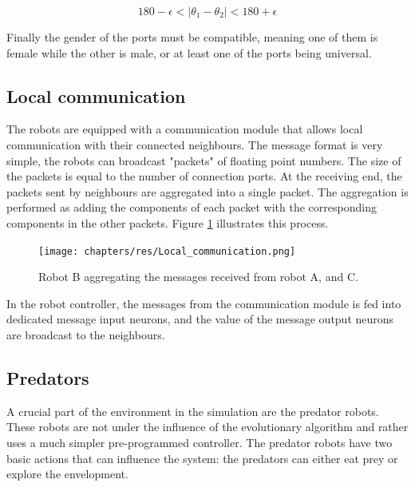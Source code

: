 \begin{equation}
	180 - \epsilon < |\theta_1 - \theta_2| < 180 + \epsilon
\end{equation}
		
Finally the gender of the ports must be compatible, meaning one of them is female while the other is male, or at least one of the ports being universal.
		
\subsection{Local communication}
The robots are equipped with a communication module that allows local communication with their connected neighbours.
The message format is very simple, the robots can broadcast "packets" of floating point numbers.
The size of the packets is equal to the number of connection ports.
At the receiving end, the packets sent by neighbours are aggregated into a single packet.
The aggregation is performed as adding the components of each packet with the corresponding components in the other packets. Figure \ref{fig:local_communication} illustrates this process.
	
\begin{figure}[H]
	\centering
	\texttt{[image: chapters/res/Local\_communication.png]}
	\caption{Robot B aggregating the messages received from robot A, and C.}
	\label{fig:local_communication}
\end{figure}
	
In the robot controller, the messages from the communication module is fed into dedicated message input neurons, and the value of the message output neurons are broadcast to the neighbours.

		
\subsection{Predators}
A crucial part of the environment in the simulation are the predator robots.
These robots are not under the influence of the evolutionary algorithm and rather uses a much simpler pre-programmed controller.
The predator robots have two basic actions that can influence the system: the predators can either eat prey or explore the envelopment.

